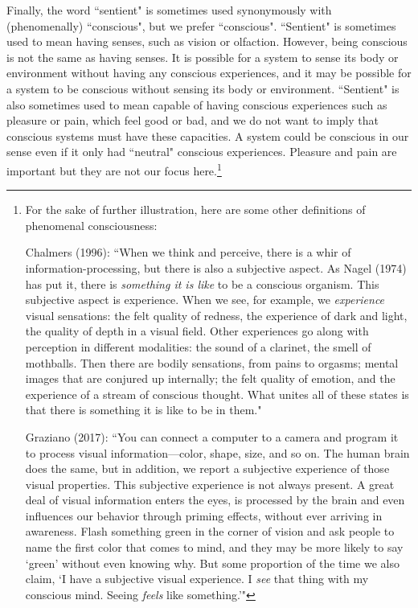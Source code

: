 \documentclass[12pt]{article}
\begin{document}
Finally, the word ``sentient" is sometimes used synonymously with (phenomenally) ``conscious", but we prefer ``conscious". ``Sentient" is sometimes used to mean having senses, such as vision or olfaction. However, being conscious is not the same as having senses. It is possible for a system to sense its body or environment without having any conscious experiences, and it may be possible for a system to be conscious without sensing its body or environment. ``Sentient" is also sometimes used to mean capable of having conscious experiences such as pleasure or pain, which feel good or bad, and we do not want to imply that conscious systems must have these capacities. A system could be conscious in our sense even if it only had ``neutral" conscious experiences. Pleasure and pain are important but they are not our focus here.\footnote{For the sake of further illustration, here are some other definitions of phenomenal consciousness: 

Chalmers (1996): ``When we think and perceive, there is a whir of information-processing, but there is also a subjective aspect. As Nagel (1974) has put it, there is \textit{something it is like} to be a conscious organism. This subjective aspect is experience. When we see, for example, we \textit{experience} visual sensations: the felt quality of redness, the experience of dark and light, the quality of depth in a visual field. Other experiences go along with perception in different modalities: the sound of a clarinet, the smell of mothballs. Then there are bodily sensations, from pains to orgasms; mental images that are conjured up internally; the felt quality of emotion, and the experience of a stream of conscious thought. What unites all of these states is that there is something it is like to be in them."

Graziano (2017): ``You can connect a computer to a camera and program it to process visual information—color, shape, size, and so on. The human brain does the same, but in addition, we report a subjective experience of those visual properties. This subjective experience is not always present. A great deal of visual information enters the eyes, is processed by the brain and even influences our behavior through priming effects, without ever arriving in awareness. Flash something green in the corner of vision and ask people to name the first color that comes to mind, and they may be more likely to say `green' without even knowing why. But some proportion of the time we also claim, `I have a subjective visual experience. I \textit{see} that thing with my conscious mind. Seeing \textit{feels} like something.'"
}
\end{document}
